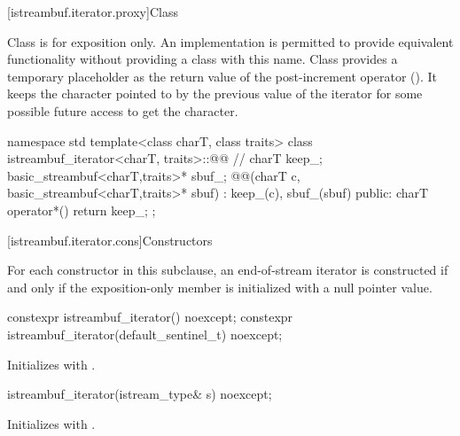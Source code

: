 [istreambuf.iterator.proxy]{Class }

\pnum
Class
is for exposition only.
An implementation is permitted to provide equivalent functionality without
providing a class with this name.
Class
provides a temporary
placeholder as the return value of the post-increment operator
().
It keeps the character pointed to by the previous value
of the iterator for some possible future access to get the character.

%
\begin{codeblock}
namespace std {
  template<class charT, class traits>
  class istreambuf_iterator<charT, traits>::@@ { // \expos
    charT keep_;
    basic_streambuf<charT,traits>* sbuf_;
    @@(charT c, basic_streambuf<charT,traits>* sbuf)
      : keep_(c), sbuf_(sbuf) { }
  public:
    charT operator*() { return keep_; }
  };
}
\end{codeblock}

[istreambuf.iterator.cons]{Constructors}

\pnum
For each  constructor in this subclause,
an end-of-stream iterator is constructed if and only if
the exposition-only member  is initialized with a null pointer value.


\begin{indexed}{}
\begin{itemdecl}
constexpr istreambuf_iterator() noexcept;
constexpr istreambuf_iterator(default_sentinel_t) noexcept;
\end{itemdecl}
\end{indexed}

\begin{itemdescr}
\pnum
\effects
Initializes  with .
\end{itemdescr}

\begin{indexed}{}
\begin{itemdecl}
istreambuf_iterator(istream_type& s) noexcept;
\end{itemdecl}
\end{indexed}

\begin{itemdescr}
\pnum
\effects
Initializes  with .
\end{itemdescr}

